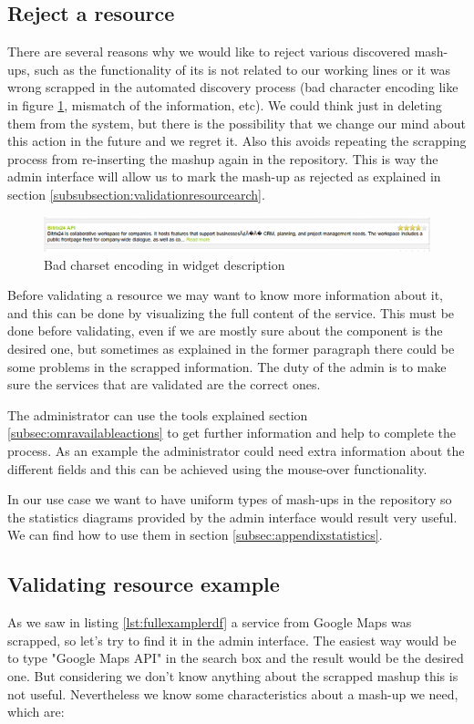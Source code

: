 \subsection{Reject a resource}

There are several reasons why we would like to reject various discovered mash-ups, such as the functionality of its is not related to our working lines or it was wrong scrapped in the automated discovery process (bad character encoding like in figure \ref{fig:badencoding}, mismatch of the information, etc). We could think just in deleting them from the system, but there is the possibility that we change our mind about this action in the future and we regret it. Also this avoids repeating the scrapping process from re-inserting the mashup again in the repository. This is way the admin interface will allow us to mark the mash-up as rejected as explained in section \ref{subsubsection:validationresourcearch}.

\begin{figure}[h]
	\centering
	\includegraphics[width=400pt]{graphics/omr-bad-encoding.png}
	\caption{Bad charset encoding in widget description}
	\label{fig:badencoding}
\end{figure}

Before validating a resource we may want to know more information about it, and this can be done by visualizing the full content of the service. This must be done before validating, even if we are mostly sure about the component is the desired one, but sometimes as explained in the former paragraph there could be some problems in the scrapped information. The duty of the admin is to make sure the services that are validated are the correct ones.

The administrator can use the tools explained section \ref{subsec:omravailableactions} to get further information and help to complete the process. As an example the administrator could need extra information about the different fields and this can be achieved using the mouse-over functionality.

In our use case we want to have uniform types of mash-ups in the repository so the statistics diagrams provided by the admin interface would result very useful. We can find how to use them in section \ref{subsec:appendixstatistics}.

\subsection{Validating resource example}
As we saw in listing \ref{lst:fullexamplerdf} a service from Google Maps was scrapped, so let's try to find it in the admin interface. The easiest way would be to type "Google Maps API" in the search box and the result would be the desired one. But considering we don't know anything about the scrapped mashup this is not useful. Nevertheless we know some characteristics about a mash-up we need, which are:

